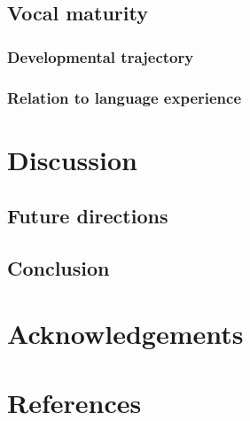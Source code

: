 \documentclass[floatsintext,man]{apa6}
\theoremstyle{definition}
\theoremstyle{definition}
\theoremstyle{definition}
\theoremstyle{remark}
\begin{document}
\subsection{Vocal maturity}\label{vocal-maturity}

\subsubsection{Developmental trajectory}\label{developmental-trajectory}

\subsubsection{Relation to language
experience}\label{relation-to-language-experience}

\section{Discussion}\label{disc}

\subsection{Future directions}\label{disc-future}

\subsection{Conclusion}\label{disc-conclusion}

\section{Acknowledgements}\label{acknowledgements}

\newpage

\section{References}\label{refs}

\begingroup
\setlength{\parindent}{-0.5in} \setlength{\leftskip}{0.5in}

\hypertarget{refs}{}

\endgroup
\end{document}
